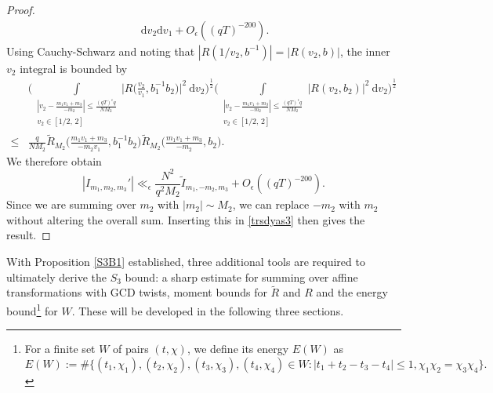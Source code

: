 \documentclass[12pt]{amsart}
\theoremstyle{definition}
\theoremstyle{plain}
\theoremstyle{remark}
\numberwithin{equation}{section}
\numberwithin{theorem}{section}
\numberwithin{equation}{section}
\begin{document}
\begin{proof}
\begin{align*}
			\:\mathrm{d}v_{2}\mathrm{d}v_{1}+O_{\epsilon}((qT)^{-200}).
		\end{align*}
		Using Cauchy-Schwarz and noting that $|R(1/v_2, b^{-1})|=|R(v_{2}, b)|$, the inner $v_2$ integral is bounded by 
		\begin{align*}
			&\bigg(\int\limits_{\substack{|v_{2}-\frac{m_{1}v_{1}+m_{3}}{-m_{2}}|\leq \frac{(qT)^{\epsilon}q}{NM_{2}} \\ v_{2} \in [1/2,\, 2]}}\bigg| R\bigg(\frac{v_{2}}{v_{1}}, b_{1}^{-1}b_{2}\bigg)\bigg|^{2}
			\:\mathrm{d}v_{2}\bigg)^{\frac{1}{2}}
			\bigg(\int\limits_{\substack{|v_{2}-\frac{m_{1}v_{1}+m_{3}}{-m_{2}}|\leq \frac{(qT)^{\epsilon}q}{NM_{2}} \\ v_{2} \in [1/2,\, 2]}}| R(v_{2}, b_{2})|^{2}
			\:\mathrm{d}v_{2}\bigg)^{\frac{1}{2}}
			\\
			\leq& \frac{q}{NM_{2}}\tilde{R}_{M_{2}}\bigg(\frac{m_{1}v_{1}+m_{3}}{-m_{2}v_{1}}, b_{1}^{-1}b_{2}\bigg)\tilde{R}_{M_{2}}\bigg(\frac{m_{1}v_{1}+m_{3}}{-m_{2}}, b_{2}\bigg).
		\end{align*}
		We therefore obtain 
		\[|I_{m_{1}, m_{2}, m_{3}}'| \ll_{\epsilon} \frac{N^{2}}{q^{2}M_{2}}\tilde{I}_{m_{1}, -m_{2}, m_{3}}+O_{\epsilon}((qT)^{-200}).\]
		Since we are summing over $m_{2}$ with $|m_{2}|\sim M_{2}$, we can replace $-m_{2}$ with $m_{2}$ without altering the overall sum. Inserting this in \eqref{trsdyas3} then gives the result.
	\end{proof}
	
	With Proposition \ref{S3B1} established, three additional tools are required to ultimately derive the $S_{3}$ bound: a sharp estimate for summing over affine transformations with GCD twists, moment bounds for $\tilde{R}$ and $R$ and the energy bound\footnote{For a finite set $W$ of pairs $(t, \chi)$, we define its energy $E(W)$ as
		\[E(W):=\# \{ (t_1,\chi_1), (t_2,\chi_2), (t_3,\chi_3) , (t_4,\chi_4) \in W :     |t_{1}+t_{2}-t_{3}-t_{4}| \leq 1,  \chi_{1}\chi_{2}=\chi_{3}\chi_{4}\}.\]} for $W$. These will be developed in the following three sections.
	
\end{document}
